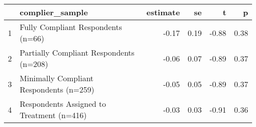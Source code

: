 \begin{table}[ht]
\centering
\begin{tabular}{rlrrrr}
  \hline
 & complier\_sample & estimate & se & t & p \\ 
  \hline
1 & Fully Compliant Respondents (n=66) & -0.17 & 0.19 & -0.88 & 0.38 \\ 
  2 & Partially Compliant Respondents (n=208) & -0.06 & 0.07 & -0.89 & 0.37 \\ 
  3 & Minimally Compliant Respondents (n=259) & -0.05 & 0.05 & -0.89 & 0.37 \\ 
  4 & Respondents Assigned to Treatment (n=416) & -0.03 & 0.03 & -0.91 & 0.36 \\ 
   \hline
\end{tabular}
\end{table}
